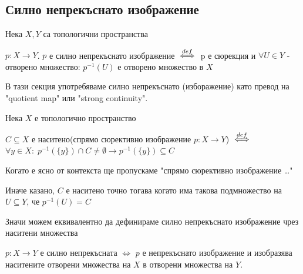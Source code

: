 \subsection{Силно непрекъснато изображение}
\begin{definition}
    Нека $X, Y$ са топологични пространства
    
    $p: X \to Y$. $p$ е силно непрекъснато изображение ${\overset{def}{\iff}}$ p е сюрекция и $\forall U \in Y$ - отворено множество: $p^{-1}(U)$ е отворено множество в $X$
\end{definition}
\begin{notation}
    В тази секция употребяваме силно непрекъснато (изборажение) като превод на "quotient map" или "strong continuity".
\end{notation}
\begin{definition}
    Нека $X$ е топологично пространство
    
    $C \subseteq X$ е наситено(спрямо сюрективно изображение $p: X\to Y$) ${\overset{def}{\iff}}$ $\forall y \in X:\; p^{-1}(\{y\}) \cap C \neq \emptyset \rightarrow p^{-1}(\{y\}) \subseteq C$  
\end{definition}
\begin{notation}
    Когато е ясно от контекста ще пропускаме "спрямо сюрективно изображение \dots"
\end{notation}
Иначе казано, $C$ е наситено точно тогава когато има такова подмножество на $U \subseteq Y$, че $p^{-1}(U) = C$

Значи можем еквивалентно да дефинираме силно непрекъснато изображение чрез наситени множества
\begin{proposition}
    $p: X \to Y$ е силно непрекъсната $\iff$ $p$ е непрекъснато изображение и изобразява наситените отворени множества на $X$ в отворени множества на $Y$.
\end{proposition}

